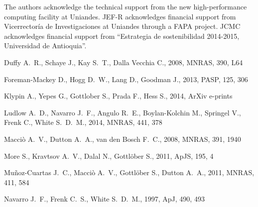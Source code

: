 \documentclass[a4,useAMS,usenatbib,usegraphicx]{mn2e}
\newcommand{\apj}{ApJ}
\newcommand{\apjs}{ApJS}
\newcommand{\mnras}{MNRAS}
\newcommand{\pasp}{PASP}
\begin{document}
 The authors acknowledge the technical support from the new
 high-performance computing facility at Uniandes. JEF-R acknowledges
 financial support from Vicerrector\'ia de Investigaciones at Uniandes
 through a FAPA project. JCMC acknowledges financial support from
 ``Estrategia de  sostenibilidad 2014-2015, Universidad de
 Antioquia''.    


%
\begin{thebibliography}{}

{Duffy} A.~R.,  {Schaye} J.,  {Kay} S.~T.,    {Dalla Vecchia} C.,  2008,
  \mnras, 390, L64

{Foreman-Mackey} D.,  {Hogg} D.~W.,  {Lang} D.,    {Goodman} J.,  2013, \pasp,
  125, 306

{Klypin} A.,  {Yepes} G.,  {Gottlober} S.,  {Prada} F.,    {Hess} S.,  2014,
  ArXiv e-prints

{Ludlow} A.~D.,  {Navarro} J.~F.,  {Angulo} R.~E.,  {Boylan-Kolchin} M.,
  {Springel} V.,  {Frenk} C.,    {White} S.~D.~M.,  2014, \mnras, 441, 378

{Macci{\`o}} A.~V.,  {Dutton} A.~A.,    {van den Bosch} F.~C.,  2008, \mnras,
  391, 1940

{More} S.,  {Kravtsov} A.~V.,  {Dalal} N.,    {Gottl{\"o}ber} S.,  2011, \apjs,
  195, 4

{Mu{\~n}oz-Cuartas} J.~C.,  {Macci{\`o}} A.~V.,  {Gottl{\"o}ber} S.,
  {Dutton} A.~A.,  2011, \mnras, 411, 584

{Navarro} J.~F.,  {Frenk} C.~S.,    {White} S.~D.~M.,  1997, \apj, 490, 493


\end{thebibliography}
\end{document}
